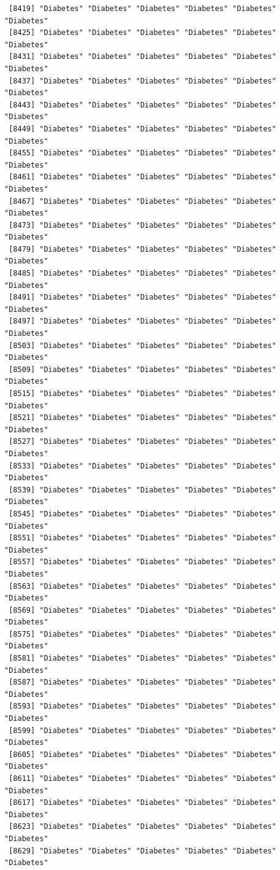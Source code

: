 \documentclass[
  letterpaper,
  DIV=11,
  numbers=noendperiod]{scrartcl}
\begin{document}
\begin{verbatim}
 [8419] "Diabetes" "Diabetes" "Diabetes" "Diabetes" "Diabetes" "Diabetes"
 [8425] "Diabetes" "Diabetes" "Diabetes" "Diabetes" "Diabetes" "Diabetes"
 [8431] "Diabetes" "Diabetes" "Diabetes" "Diabetes" "Diabetes" "Diabetes"
 [8437] "Diabetes" "Diabetes" "Diabetes" "Diabetes" "Diabetes" "Diabetes"
 [8443] "Diabetes" "Diabetes" "Diabetes" "Diabetes" "Diabetes" "Diabetes"
 [8449] "Diabetes" "Diabetes" "Diabetes" "Diabetes" "Diabetes" "Diabetes"
 [8455] "Diabetes" "Diabetes" "Diabetes" "Diabetes" "Diabetes" "Diabetes"
 [8461] "Diabetes" "Diabetes" "Diabetes" "Diabetes" "Diabetes" "Diabetes"
 [8467] "Diabetes" "Diabetes" "Diabetes" "Diabetes" "Diabetes" "Diabetes"
 [8473] "Diabetes" "Diabetes" "Diabetes" "Diabetes" "Diabetes" "Diabetes"
 [8479] "Diabetes" "Diabetes" "Diabetes" "Diabetes" "Diabetes" "Diabetes"
 [8485] "Diabetes" "Diabetes" "Diabetes" "Diabetes" "Diabetes" "Diabetes"
 [8491] "Diabetes" "Diabetes" "Diabetes" "Diabetes" "Diabetes" "Diabetes"
 [8497] "Diabetes" "Diabetes" "Diabetes" "Diabetes" "Diabetes" "Diabetes"
 [8503] "Diabetes" "Diabetes" "Diabetes" "Diabetes" "Diabetes" "Diabetes"
 [8509] "Diabetes" "Diabetes" "Diabetes" "Diabetes" "Diabetes" "Diabetes"
 [8515] "Diabetes" "Diabetes" "Diabetes" "Diabetes" "Diabetes" "Diabetes"
 [8521] "Diabetes" "Diabetes" "Diabetes" "Diabetes" "Diabetes" "Diabetes"
 [8527] "Diabetes" "Diabetes" "Diabetes" "Diabetes" "Diabetes" "Diabetes"
 [8533] "Diabetes" "Diabetes" "Diabetes" "Diabetes" "Diabetes" "Diabetes"
 [8539] "Diabetes" "Diabetes" "Diabetes" "Diabetes" "Diabetes" "Diabetes"
 [8545] "Diabetes" "Diabetes" "Diabetes" "Diabetes" "Diabetes" "Diabetes"
 [8551] "Diabetes" "Diabetes" "Diabetes" "Diabetes" "Diabetes" "Diabetes"
 [8557] "Diabetes" "Diabetes" "Diabetes" "Diabetes" "Diabetes" "Diabetes"
 [8563] "Diabetes" "Diabetes" "Diabetes" "Diabetes" "Diabetes" "Diabetes"
 [8569] "Diabetes" "Diabetes" "Diabetes" "Diabetes" "Diabetes" "Diabetes"
 [8575] "Diabetes" "Diabetes" "Diabetes" "Diabetes" "Diabetes" "Diabetes"
 [8581] "Diabetes" "Diabetes" "Diabetes" "Diabetes" "Diabetes" "Diabetes"
 [8587] "Diabetes" "Diabetes" "Diabetes" "Diabetes" "Diabetes" "Diabetes"
 [8593] "Diabetes" "Diabetes" "Diabetes" "Diabetes" "Diabetes" "Diabetes"
 [8599] "Diabetes" "Diabetes" "Diabetes" "Diabetes" "Diabetes" "Diabetes"
 [8605] "Diabetes" "Diabetes" "Diabetes" "Diabetes" "Diabetes" "Diabetes"
 [8611] "Diabetes" "Diabetes" "Diabetes" "Diabetes" "Diabetes" "Diabetes"
 [8617] "Diabetes" "Diabetes" "Diabetes" "Diabetes" "Diabetes" "Diabetes"
 [8623] "Diabetes" "Diabetes" "Diabetes" "Diabetes" "Diabetes" "Diabetes"
 [8629] "Diabetes" "Diabetes" "Diabetes" "Diabetes" "Diabetes" "Diabetes"

\end{verbatim}
\end{document}
